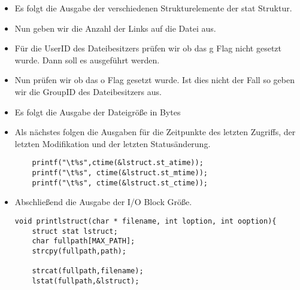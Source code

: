 \begin{itemize}
\item Es folgt die Ausgabe der verschiedenen Strukturelemente der stat
Struktur.
\item Nun geben wir die Anzahl der Links auf die Datei aus.
\newline
{}
\newline
\item Für die UserID des Dateibesitzers prüfen wir ob das g Flag nicht
gesetzt wurde. Dann soll es ausgeführt werden.
\newline
{}
\newline
\item Nun prüfen wir ob das o Flag gesetzt wurde. Ist dies nicht
der Fall so geben wir die GroupID des Dateibesitzers aus.
\newline
{}
\newline

\item Es folgt die Ausgabe der Dateigröße in Bytes
\newline
{}
\newline

\item Als nächstes folgen die Ausgaben für die Zeitpunkte des letzten Zugriffs,
der letzten Modifikation und der letzten Statusänderung.

\begin{lstlisting}
	printf("\t%s",ctime(&lstruct.st_atime));
	printf("\t%s", ctime(&lstruct.st_mtime));
	printf("\t%s", ctime(&lstruct.st_ctime));
\end{lstlisting}

\item Abschließend die Ausgabe der I/O Block Größe.
\newline
{}
\newline


\begin{lstlisting}
void printlstruct(char * filename, int loption, int ooption){
	struct stat lstruct;
	char fullpath[MAX_PATH];
	strcpy(fullpath,path);

	strcat(fullpath,filename);
	lstat(fullpath,&lstruct);


\end{lstlisting}
\end{itemize}
